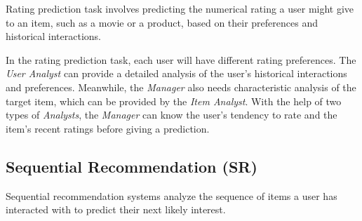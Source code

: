 Rating prediction task involves predicting the numerical rating a user might give to an item, such as a movie or a product, based on their preferences and historical interactions.

In the rating prediction task, each user will have different rating preferences.
The \textsl{User Analyst} can provide a detailed analysis of the user's historical interactions and preferences.
Meanwhile, the \textsl{Manager} also needs characteristic analysis of the target item, which can be provided by the \textsl{Item Analyst}.
With the help of two types of \textsl{Analysts}, the \textsl{Manager} can know the user's tendency to rate and the item's recent ratings before giving a prediction.



\subsection{Sequential Recommendation (SR)}

Sequential recommendation systems analyze the sequence of items a user has interacted with to predict their next likely interest.

